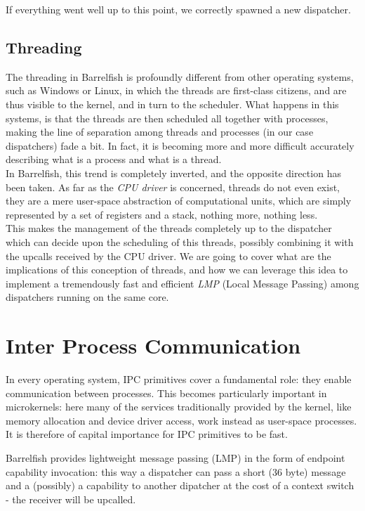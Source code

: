 \documentclass[a4paper,twoside,openright]{report}
\begin{document}
If everything went well up to this point, we correctly spawned a new dispatcher.

\section{Threading}
The threading in Barrelfish is profoundly different from other operating systems, such as Windows or Linux, in which the threads are first-class citizens, and are thus visible to the kernel, and in turn to the scheduler.
What happens in this systems, is that the threads are then scheduled all together with processes, making the line of separation among threads and processes (in our case dispatchers) fade a bit.
In fact, it is becoming more and more difficult accurately describing what is a process and what is a thread.\\

In Barrelfish, this trend is completely inverted, and the opposite direction has been taken.
As far as the \emph{CPU driver} is concerned, threads do not even exist, they are a mere user-space abstraction of computational units, which are simply represented by a set of registers and a stack, nothing more, nothing less.\\

This makes the management of the threads completely up to the dispatcher which can decide upon the scheduling of this threads, possibly combining it with the upcalls received by the CPU driver.
We are going to cover what are the implications of this conception of threads, and how we can leverage this idea to implement a tremendously fast and efficient \emph{LMP} (Local Message Passing) among dispatchers running on the same core.


\chapter{Inter Process Communication}
In every operating system, IPC primitives cover a fundamental role: they enable communication between processes. This becomes particularly important in microkernels: here many of the services traditionally provided by the kernel, like memory allocation and device driver access, work instead as user-space processes. It is therefore of capital importance for IPC primitives to be fast.

Barrelfish provides lightweight message passing (LMP) in the form of endpoint capability invocation: this way a dispatcher can pass a short (36 byte) message and a (possibly) a capability to another dipatcher at the cost of a context switch - the receiver will be upcalled.
\end{document}
